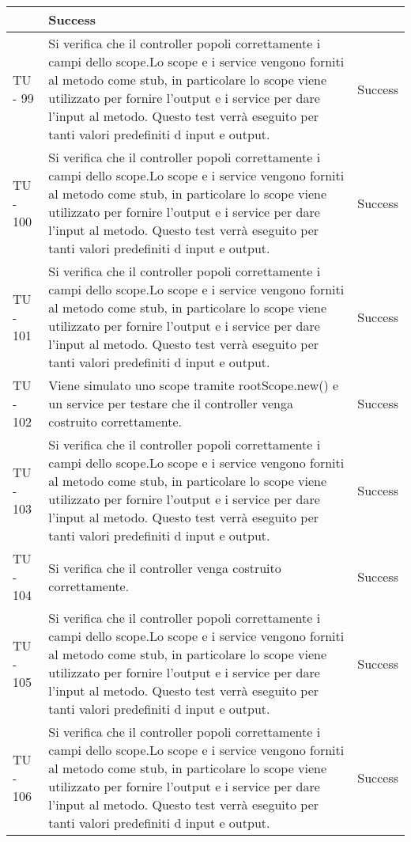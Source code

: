\begin{center}
\begin{longtable}{ | p{3cm} | p{9cm} | p{2cm} | }
 & Success \\ \hline
TU - 99 & Si verifica che il controller popoli correttamente i campi dello scope.Lo scope e i service vengono forniti al metodo come stub, in particolare lo scope viene utilizzato per fornire l'output e i service per dare l'input al metodo. Questo test verrà eseguito per tanti valori predefiniti d input e output. & Success \\ \hline
TU - 100 & Si verifica che il controller popoli correttamente i campi dello scope.Lo scope e i service vengono forniti al metodo come stub, in particolare lo scope viene utilizzato per fornire l'output e i service per dare l'input al metodo. Questo test verrà eseguito per tanti valori predefiniti d input e output. & Success \\ \hline
TU - 101 & Si verifica che il controller popoli correttamente i campi dello scope.Lo scope e i service vengono forniti al metodo come stub, in particolare lo scope viene utilizzato per fornire l'output e i service per dare l'input al metodo. Questo test verrà eseguito per tanti valori predefiniti d input e output. & Success \\ \hline
TU - 102 & Viene simulato uno scope tramite rootScope.new() e un service per testare che il controller venga costruito correttamente.
 & Success \\ \hline
TU - 103 & Si verifica che il controller popoli correttamente i campi dello scope.Lo scope e i service vengono forniti al metodo come stub, in particolare lo scope viene utilizzato per fornire l'output e i service per dare l'input al metodo. Questo test verrà eseguito per tanti valori predefiniti d input e output.
 & Success \\ \hline
TU - 104 & Si verifica che il controller venga costruito correttamente. & Success \\ \hline
TU - 105 & Si verifica che il controller popoli correttamente i campi dello scope.Lo scope e i service vengono forniti al metodo come stub, in particolare lo scope viene utilizzato per fornire l'output e i service per dare l'input al metodo. Questo test verrà eseguito per tanti valori predefiniti d input e output.
 & Success \\ \hline
TU - 106 & Si verifica che il controller popoli correttamente i campi dello scope.Lo scope e i service vengono forniti al metodo come stub, in particolare lo scope viene utilizzato per fornire l'output e i service per dare l'input al metodo. Questo test verrà eseguito per tanti valori predefiniti d input e output. & Success \\ \hline

\end{longtable}
\end{center}
